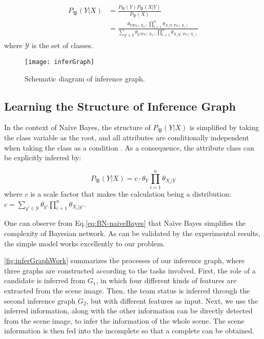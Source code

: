 \vspace{-1ex}
\begin{align}\label{eq:BNWithCls}
\begin{split}
P_\mathfrak{B}(Y|{X}) & = 
\frac{ P_\mathfrak{B}(Y) P_\mathfrak{B}({X}|Y) }{P_\mathfrak{B}({X})}\\
&=\frac{ \theta_{Y|\text{Pa}({X}_0)} \prod_{i=1}^{n} \theta_{X_i|Y, \text{Pa}({X}_i)} }{ \sum_{y'\in \mathcal{Y}} \theta_{y'|\text{Pa}({X}_0)} \prod_{i=1}^{n} \theta_{X_i|y', \text{Pa}({X}_i)} }
\end{split}
\end{align}
where $\mathcal{Y}$ is the set of classes.

\begin{figure}[tb]
\centering
\texttt{[image: inferGraph]}
\caption{Schematic diagram of inference graph.}
\vspace{-4ex}
\label{fig:inferGraphWork}
\end{figure}

\subsection{Learning the Structure of Inference Graph}

In the context of Na\"{i}ve Bayes, 
the structure of $P_\mathfrak{B}(Y|{X})$ is simplified by taking the class variable as the root, and all attributes are conditionally independent when taking the class as a condition \cite{petitjean2018accurate}. As a consequence, the attribute class can be explicitly inferred by:

\begin{equation}\label{eq:BN-naiveBayes}
P_\mathfrak{B}(Y| {X}) = c \cdot \theta_Y \prod_{i=1}^{n}\theta_{X_i|Y}
\end{equation}
where $c$ is a scale factor that makes the calculation being a distribution: $c=\sum_{y'\in \mathcal{Y}}  \theta_{y'} \prod_{i=1}^{n}\theta_{X_i|y'}$.

One can observe from Eq.\eqref{eq:BN-naiveBayes} that Na\"{i}ve Bayes simplifies the complexity of Bayesian network. As can be validated by the experimental results, the simple model works excellently to our problem. 

\autoref{fig:inferGraphWork} summarizes the processes of our inference graph, where three graphs are constructed according to the tasks involved. First, the role of a candidate is inferred from $G_1$, in which four different kinds of features are extracted from the scene image. Then, the team status is inferred through the second inference graph $G_2$, but with different features as input. Next, we use the inferred information, along with the other information can be directly detected from the scene image, to infer the information of the whole scene.
The scene information is then fed into the incomplete  so that a complete  can be obtained. 

